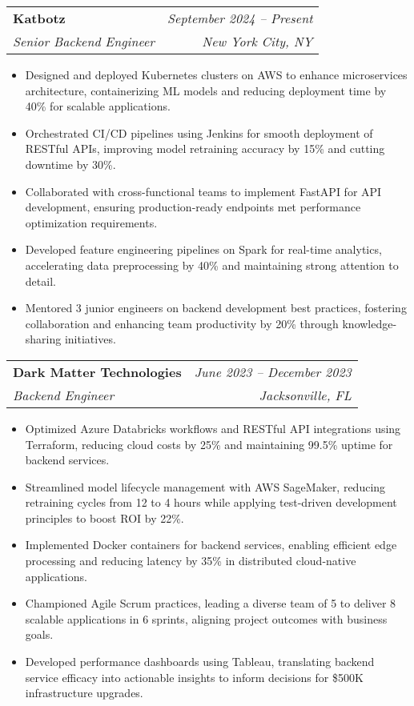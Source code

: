 \documentclass[letterpaper,10pt]{article}
\makeatletter
\newcommand{\resumeItem}[1]{
  \item\small{
    {#1 \vspace{-1.5pt}}
  }
}
\newcommand{\resumeSubheading}[4]{
  \vspace{-2pt}\item
    \begin{tabular*}{0.97\textwidth}[t]{l@{\extracolsep{\fill}}r}
      \textbf{#1} & #2 \\
      \textit{\small#3} & \textit{\small #4} \\
    \end{tabular*}\vspace{-5pt}
}
\newcommand{\resumeItemListStart}{\begin{itemize}[leftmargin=0.15in]}
\newcommand{\resumeItemListEnd}{\end{itemize}\vspace{-5pt}}
\makeatother
\begin{document}
\resumeSubheading
{Katbotz}{\textit{September 2024 -- Present}}
{Senior Backend Engineer}{New York City, NY}
\resumeItemListStart
    \resumeItem{Designed and deployed Kubernetes clusters on AWS to enhance microservices architecture, containerizing ML models and reducing deployment time by 40\% for scalable applications.}
    \resumeItem{Orchestrated CI/CD pipelines using Jenkins for smooth deployment of RESTful APIs, improving model retraining accuracy by 15\% and cutting downtime by 30\%.}
    \resumeItem{Collaborated with cross-functional teams to implement FastAPI for API development, ensuring production-ready endpoints met performance optimization requirements.}
    \resumeItem{Developed feature engineering pipelines on Spark for real-time analytics, accelerating data preprocessing by 40\% and maintaining strong attention to detail.}
    \resumeItem{Mentored 3 junior engineers on backend development best practices, fostering collaboration and enhancing team productivity by 20\% through knowledge-sharing initiatives.}
\resumeItemListEnd

\resumeSubheading
{Dark Matter Technologies}{\textit{June 2023 -- December 2023}}
{Backend Engineer}{Jacksonville, FL}
\resumeItemListStart
    \resumeItem{Optimized Azure Databricks workflows and RESTful API integrations using Terraform, reducing cloud costs by 25\% and maintaining 99.5\% uptime for backend services.}
    \resumeItem{Streamlined model lifecycle management with AWS SageMaker, reducing retraining cycles from 12 to 4 hours while applying test-driven development principles to boost ROI by 22\%.}
    \resumeItem{Implemented Docker containers for backend services, enabling efficient edge processing and reducing latency by 35\% in distributed cloud-native applications.}
    \resumeItem{Championed Agile Scrum practices, leading a diverse team of 5 to deliver 8 scalable applications in 6 sprints, aligning project outcomes with business goals.}
    \resumeItem{Developed performance dashboards using Tableau, translating backend service efficacy into actionable insights to inform decisions for \$500K infrastructure upgrades.}
\resumeItemListEnd
\end{document}
